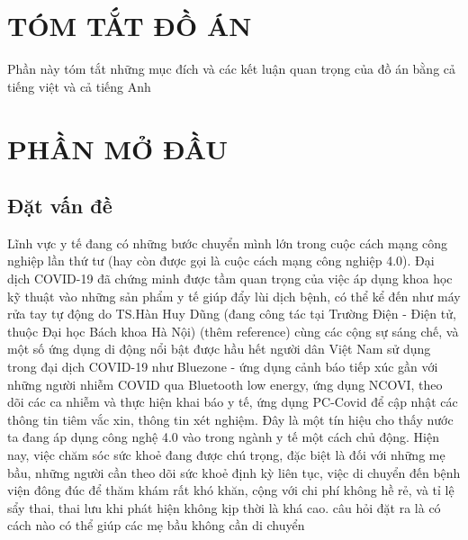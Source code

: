 \documentclass{article}%
\renewcommand{\tablename}{\fontsize{12pt}{0pt}\selectfont \bfseries Bảng} %
\begin{document}
{
\let\oldnumberline\numberline
\renewcommand{\numberline}{\tablename~\oldnumberline}%
\listoftables
} %
\cleardoublepage

\section*{TÓM TẮT ĐỒ ÁN}
Phần này tóm tắt những mục đích và các kết luận quan trọng của đồ án bằng cả tiếng việt và cả tiếng Anh
\cleardoublepage

\section*{PHẦN MỞ ĐẦU}
\subsection*{Đặt vấn đề}
Lĩnh vực y tế đang có những bước chuyển mình lớn trong cuộc cách mạng công nghiệp lần thứ tư 
(hay còn được gọi là cuộc cách mạng công nghiệp 4.0). Đại dịch COVID-19 đã chứng minh được tầm quan trọng của việc áp dụng
khoa học kỹ thuật vào những sản phẩm y tế giúp đẩy lùi dịch bệnh,
có thể kể đến như máy rửa tay tự động do TS.Hàn Huy Dũng (đang công tác tại Trường Điện - Điện tử, thuộc Đại học Bách khoa Hà Nội) 
(thêm reference) cùng các cộng sự sáng chế, và một số ứng dụng di động
nổi bật được hầu hết người dân Việt Nam sử dụng trong đại dịch COVID-19 như Bluezone - ứng dụng cảnh báo tiếp xúc gần với
những người nhiễm COVID qua Bluetooth low energy, ứng dụng NCOVI, theo dõi các ca nhiễm và thực hiện khai báo y tế, ứng
dụng PC-Covid để cập nhật các thông tin tiêm vắc xin, thông tin xét nghiệm. Đây là một tín hiệu cho thấy nước ta đang áp
dụng công nghệ 4.0 vào trong ngành y tế một cách chủ động. Hiện nay, việc chăm sóc sức khoẻ đang được chú trọng, đặc biệt
là đối với những mẹ bầu, những người cần theo dõi sức khoẻ định kỳ liên tục, việc di chuyển đến bệnh viện đông đúc để
thăm khám rất khó khăn, cộng với chi phí không hề rẻ, và tỉ lệ sẩy thai, thai lưu khi phát hiện không kịp thời là khá cao.
câu hỏi đặt ra là có cách nào có thể giúp các mẹ bầu không cần di
chuyển
\end{document}
